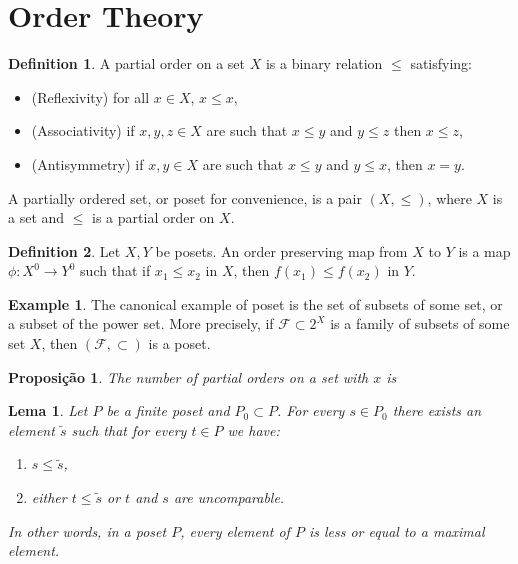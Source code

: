 \documentclass[]{article}
\newtheorem{proposition}{Proposição}[section]
\newtheorem{lemma}{Lema}[section]
\theoremstyle{definition}
\newtheorem{definition}{Definition}[section]
\theoremstyle{definition}
\newtheorem{exmp}{Example}[section]
\newcommand{\raw}{\rightarrow}
\begin{document}
	
	\section{Order Theory}
	
	\begin{definition}
		A partial order on a set $X$ is a binary relation $\leq$ satisfying:
		
		\begin{itemize}
			\item (Reflexivity) for all $x \in X$, $x \leq x$,
			
			\item (Associativity) if $x, y, z \in X$ are such that $x \leq y$ and $y \leq z$ then $x \leq z$,
			
			\item (Antisymmetry) if $x, y \in X$ are such that $x\leq y$ and $y\leq x$, then $x=y$.
		\end{itemize}
		
		A partially ordered set, or poset for convenience, is a pair $(X, \leq)$, where $X$ is a set and $\leq$ is a partial order on $X$.
	\end{definition}
	
	\begin{definition}
		Let $X, Y$ be posets. An order preserving map from $X$ to $Y$ is a map $\phi:X^0 \raw Y^0$ such that if $x_1 \leq x_2$ in $X$, then $f(x_1) \leq f(x_2)$ in $Y$.
	\end{definition}
	
	\begin{exmp}
		The canonical example of poset is the set of subsets of some set, or a subset of the power set. More precisely, if $\mathcal{F} \subset 2^X$ is a family of subsets of some set $X$, then $(\mathcal{F}, \subset)$ is a poset.
		
	\end{exmp}
	
	
	\begin{proposition}
		The number of partial orders on a set with $x$ is
	\end{proposition}
	
	\begin{lemma}
		Let $P$ be a finite poset and $P_0 \subset P$. For every $s \in P_0$ there exists an element $\tilde{s}$ such that for every $t \in P$ we have:
		
		\begin{enumerate}
			\item $s \leq \tilde{s}$,
			
			\item either $t \leq \tilde{s}$ or $t$ and $s$ are uncomparable.
		\end{enumerate}
		
		In other words, in a poset $P$, every element of $P$ is less or equal to a maximal element.
	\end{lemma}
	
\end{document}

